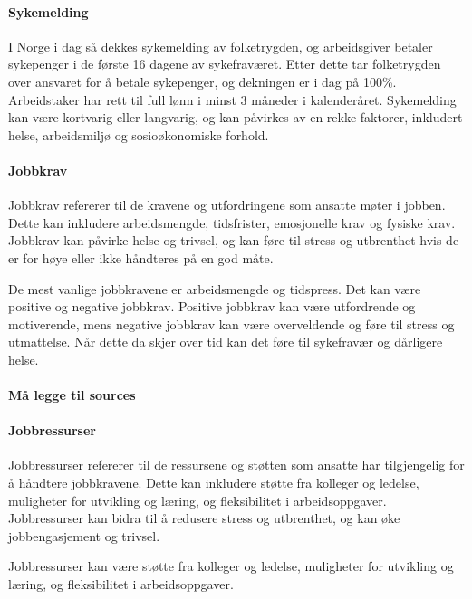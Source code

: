 \documentclass[
  12pt,
  a4paper,
  DIV=11,
  numbers=noendperiod]{scrartcl}
\let\oldparagraph\paragraph
\renewcommand{\paragraph}[1]{\oldparagraph{#1}\mbox{}}
\begin{document}
\paragraph{Sykemelding}\label{sykemelding}

I Norge i dag så dekkes sykemelding av folketrygden, og arbeidsgiver
betaler sykepenger i de første 16 dagene av sykefraværet. Etter dette
tar folketrygden over ansvaret for å betale sykepenger, og dekningen er
i dag på 100\%. Arbeidstaker har rett til full lønn i minst 3 måneder i
kalenderåret. Sykemelding kan være kortvarig eller langvarig, og kan
påvirkes av en rekke faktorer, inkludert helse, arbeidsmiljø og
sosioøkonomiske forhold.

\paragraph{Jobbkrav}\label{jobbkrav}

Jobbkrav refererer til de kravene og utfordringene som ansatte møter i
jobben. Dette kan inkludere arbeidsmengde, tidsfrister, emosjonelle krav
og fysiske krav. Jobbkrav kan påvirke helse og trivsel, og kan føre til
stress og utbrenthet hvis de er for høye eller ikke håndteres på en god
måte.

De mest vanlige jobbkravene er arbeidsmengde og tidspress. Det kan være
positive og negative jobbkrav. Positive jobbkrav kan være utfordrende og
motiverende, mens negative jobbkrav kan være overveldende og føre til
stress og utmattelse. Når dette da skjer over tid kan det føre til
sykefravær og dårligere helse.

\paragraph{Må legge til sources}\label{muxe5-legge-til-sources}

\paragraph{Jobbressurser}\label{jobbressurser}

Jobbressurser refererer til de ressursene og støtten som ansatte har
tilgjengelig for å håndtere jobbkravene. Dette kan inkludere støtte fra
kolleger og ledelse, muligheter for utvikling og læring, og
fleksibilitet i arbeidsoppgaver. Jobbressurser kan bidra til å redusere
stress og utbrenthet, og kan øke jobbengasjement og trivsel.

Jobbressurser kan være støtte fra kolleger og ledelse, muligheter for
utvikling og læring, og fleksibilitet i arbeidsoppgaver.
\end{document}
